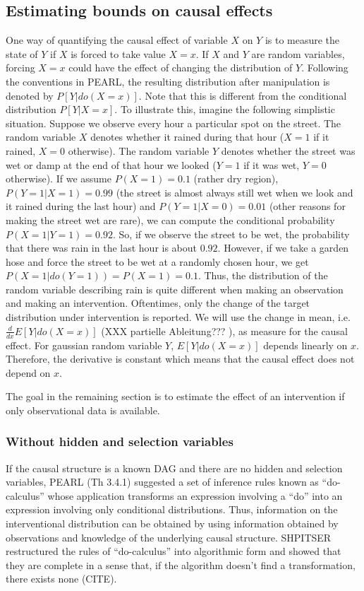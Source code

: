 \documentclass[article]{jss}
\begin{document}
\subsection{Estimating bounds on causal effects}
One way of quantifying the causal effect of variable $X$ on $Y$ is to
measure the state of $Y$ if $X$ is forced to take value $X=x$. If $X$ and
$Y$ are random variables, forcing $X=x$ could have the effect of changing
the distribution of $Y$. Following the conventions in PEARL, the resulting
distribution after manipulation is denoted by $P[Y | do(X=x)]$. Note that
this is different from the conditional distribution $P[Y | X=x]$. To
illustrate this, imagine the following simplistic situation. Suppose we
observe every hour a particular spot on the street. The random variable $X$
denotes whether it rained during that hour ($X=1$ if it rained, $X=0$
otherwise). The random variable $Y$ denotes whether the street was wet or
damp at the end of that hour we looked ($Y=1$ if it was wet, $Y=0$
otherwise). If we assume $P(X=1) = 0.1$ (rather dry region), $P(Y=1|X=1) =
0.99$ (the street is almost always still wet when we look and it rained
during the last hour) and $P(Y=1|X=0) = 0.01$ (other reasons for making the
street wet are rare), we can compute the conditional probability
$P(X=1|Y=1) = 0.92$. So, if we observe the street to be wet, the
probability that there was rain in the last hour is about $0.92$. However,
if we take a garden hose and force the street to be wet at a randomly
chosen hour, we get $P(X=1|do(Y=1)) = P(X=1) = 0.1$. Thus, the distribution
of the random variable describing rain is quite different when making an
observation and making an intervention.  Oftentimes, only the change of the
target distribution under intervention is reported. We will use the change
in mean, i.e. $\frac{d}{d x} E[Y|do(X=x)]$ (XXX partielle Ableitung??? ),
as measure for the causal effect. For gaussian random variable $Y$,
$E[Y|do(X=x)]$ depends linearly on $x$. Therefore, the derivative is
constant which means that the causal effect does not depend on $x$.

The goal in the remaining section is to estimate the effect of an
intervention if only observational data is available. 
\subsubsection{Without hidden and selection variables}
If the causal structure is a known DAG and there are no hidden and
selection variables, PEARL (Th 3.4.1) suggested a set of inference rules
known as ``do-calculus'' whose
application transforms an expression involving a ``do'' into an expression
involving only conditional distributions. Thus, information on the
interventional distribution can be obtained by using information obtained
by observations and knowledge of the underlying causal structure. SHPITSER
restructured the rules of ``do-calculus'' into algorithmic form and showed
that they are complete in a sense that, if the algorithm doesn't find a
transformation, there exists none (CITE).
\end{document}
